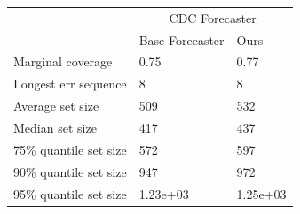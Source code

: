\begin{tabular}{lll}
\toprule
& \multicolumn{2}{c}{CDC Forecaster} \\
& Base Forecaster & Ours \\
\midrule
Marginal coverage & 0.75 & 0.77 \\
Longest err sequence & 8 & 8 \\
Average set size & 509 & 532 \\
Median set size & 417 & 437 \\
75\% quantile set size & 572 & 597 \\
90\% quantile set size & 947 & 972 \\
95\% quantile set size & 1.23e+03 & 1.25e+03 \\
\bottomrule
\end{tabular}
